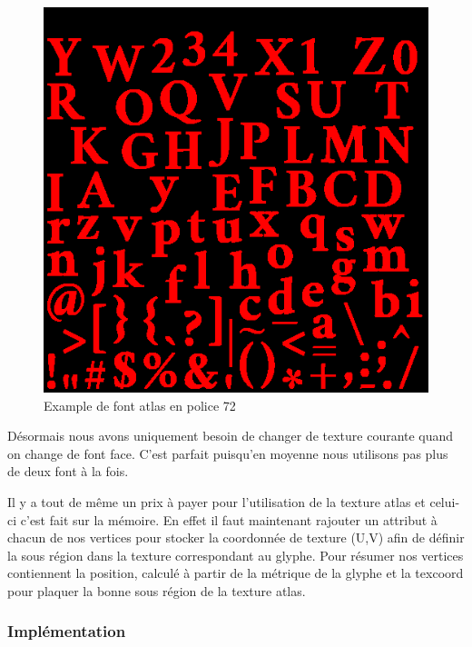 \documentclass[12pt]{article}
\begin{document}
\begin{figure}[htp]
  \centering
  \includegraphics[scale=0.8]{images/font-atlas}
  \caption{Example de font atlas en police 72}
  \label{fig:atlas}
\end{figure}

Désormais nous avons uniquement besoin de changer de texture courante quand on change de font face. C'est parfait puisqu'en moyenne nous utilisons pas plus de deux font à la fois.

Il y a tout de même un prix à payer pour l'utilisation de la texture atlas et celui-ci c'est fait sur la mémoire. En effet il faut maintenant rajouter un attribut à chacun de nos vertices
pour stocker la coordonnée de texture (U,V) afin de définir la sous région dans la texture correspondant au glyphe. Pour résumer nos vertices contiennent la position, calculé à partir de
la métrique de la glyphe et la texcoord pour plaquer la bonne sous région de la texture atlas.

\subsubsection{Implémentation}
\end{document}
